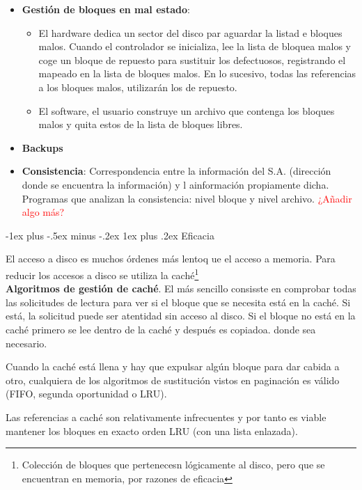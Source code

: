 \documentclass[10pt,portrait, twocolumn]{article}
\makeatletter
\renewcommand{\subsubsection}{\@startsection{subsubsection}{3}{0mm}%
                                {-1ex plus -.5ex minus -.2ex}%
                                {1ex plus .2ex}%
                                {\normalfont\small\bfseries}}
\makeatother
\begin{document}
	\begin{itemize}
		\item \textbf{Gestión de bloques en mal estado}:
			\begin{itemize}
				\item El hardware dedica un sector del disco par aguardar la listad e bloques malos. Cuando el controlador se inicializa, lee la lista de bloquea malos y coge un bloque de repuesto para sustituir los defectuosos, registrando el mapeado en la lista de bloques malos. En lo sucesivo, todas las referencias a los bloques malos, utilizarán los de repuesto.
				\item El software, el usuario construye un archivo que contenga los bloques malos y quita estos de la lista de bloques libres.
			\end{itemize}
			
		\item 	\textbf{Backups}
		\item \textbf{Consistencia}: Correspondencia entre la información del S.A. (dirección donde se encuentra la información) y l ainformación propiamente dicha. Programas que analizan la consistencia: nivel bloque y nivel archivo. \textcolor{red}{¿Añadir algo más?}
	\end{itemize}
	
\subsubsection{Eficacia}

El acceso a disco es muchos órdenes más lentoq ue el acceso a memoria. Para  reducir los accesos a disco se utiliza la caché\footnote{Colección de bloques que pertenecesn lógicamente al disco, pero que se encuentran en memoria, por razones de eficacia}\\

\textbf{Algoritmos de gestión de caché}. El más sencillo consisste en comprobar todas las solicitudes de lectura para ver si el bloque que se necesita está en la caché. Si está, la solicitud puede ser atentidad sin acceso al disco. Si el bloque no está en la caché primero se lee dentro de la caché y después es copiadoa. donde sea necesario.

	\quad Cuando la caché está llena y hay que expulsar algún bloque para dar cabida a otro, cualquiera de los algoritmos de sustitución vistos en paginación es válido (FIFO, segunda oportunidad o LRU).
	
	\quad Las referencias a caché son relativamente infrecuentes y por tanto es viable mantener los bloques en exacto orden LRU (con una lista enlazada).
	
\end{document}
